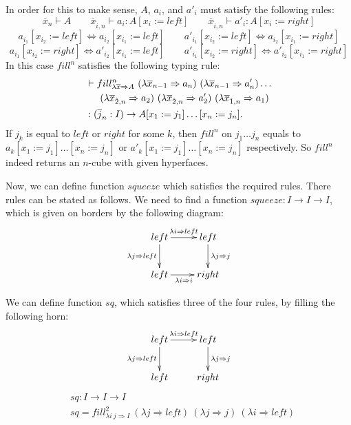 \documentclass[8pt]{amsart}
\theoremstyle{definition}
\theoremstyle{remark}
\newcommand{\red}{\Rightarrow}
\newcommand{\deq}{\Leftrightarrow}
\numberwithin{figure}{section}
\begin{document}
In order for this to make sense, $A$, $a_i$, and $a'_i$ must satisfy the following rules:
\[ \overline{x}_{n} \vdash A \qquad \overline{x}_{\hat{i},n} \vdash a_i : A[x_i := left] \qquad \overline{x}_{\hat{i},n} \vdash a'_i : A[x_i := right] \]
\[ a_{i_1}[x_{i_2} := left] \deq a_{i_2}[x_{i_1} := left] \qquad a'_{i_1}[x_{i_2} := left] \deq a_{i_2}[x_{i_1} := right] \]
\[ a_{i_1}[x_{i_2} := right] \deq a'_{i_2}[x_{i_1} := left] \qquad a'_{i_1}[x_{i_2} := right] \deq a'_{i_2}[x_{i_1} := right] \]
In this case $fill^n$ satisfies the following typing rule:
\begin{align*}
    & \vdash fill^n_{\lambda \overline{x} \red A}\ (\lambda \overline{x}_{n-1} \red a_n)\ (\lambda \overline{x}_{n-1} \red a'_n) \ldots \\
    & \indent (\lambda \overline{x}_{\hat{2},n} \red a_2)\ (\lambda \overline{x}_{\hat{2},n} \red a'_2)\ (\lambda \overline{x}_{\hat{1},n} \red a_1) \\
    & : (\overline{j}_n : I) \to A[x_1 := j_1] \ldots [x_n := j_n].
\end{align*}
If $j_k$ is equal to $left$ or $right$ for some $k$, then $fill^n$ on $j_1 \ldots j_n$ equals to $a_k[x_1 := j_1] \ldots [x_n := j_n]$ or $a'_k[x_1 := j_1] \ldots [x_n := j_n]$ respectively.
So $fill^n$ indeed returns an $n$-cube with given hyperfaces.

Now, we can define function $squeeze$ which satisfies the required rules.
There rules can be stated as follows.
We need to find a function $squeeze : I \to I \to I$, which is given on borders by the following diagram:
\[ \xymatrix{ left \ar[r]^{\lambda i \red left} \ar[d]_{\lambda j \red left} & left \ar[d]^{\lambda j \red j} \\
              left \ar[r]_{\lambda i \red i} & right
            }\]

We can define function $sq$, which satisfies three of the four rules, by filling the following horn:
\[ \xymatrix{ left \ar[r]^{\lambda i \red left} \ar[d]_{\lambda j \red left} & left \ar[d]^{\lambda j \red j} \\
              left & right
            }\]
\begin{align*}
    & sq : I \to I \to I \\
    & sq = fill^2_{\lambda i\ j \red I}\ (\lambda j \red left)\ (\lambda j \red j)\ (\lambda i \red left)
\end{align*}
\end{document}
